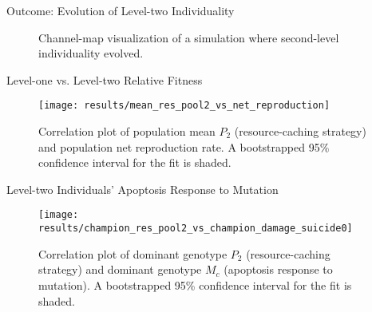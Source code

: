 \begin{frame}{Outcome: Evolution of Level-two Individuality}
\begin{figure}
\begin{columns}
\begin{column}{0.6\textwidth}
\end{column}
\begin{column}{0.4\textwidth}
%
%
%
%
%
%
%

\vspace{8ex}

\caption{Channel-map visualization of a simulation where second-level individuality evolved.}
\end{column}
\end{columns}
\end{figure}
\end{frame}

\begin{frame}{Level-one vs. Level-two Relative Fitness}

\begin{figure}
\texttt{[image: results/mean\_res\_pool2\_vs\_net\_reproduction]}
\caption{
Correlation plot of population mean $P_2$ (resource-caching strategy) and population net reproduction rate.
A bootstrapped 95\% confidence interval for the fit is shaded.
}
\end{figure}

\end{frame}

\begin{frame}{Level-two Individuals' Apoptosis Response to Mutation}

\begin{figure}
\texttt{[image: results/champion\_res\_pool2\_vs\_champion\_damage\_suicide0]}
\caption{
Correlation plot of dominant genotype $P_2$ (resource-caching strategy) and dominant genotype $M_{c}$ (apoptosis response to mutation).
A bootstrapped 95\% confidence interval for the fit is shaded.
}
\end{figure}

\end{frame}
